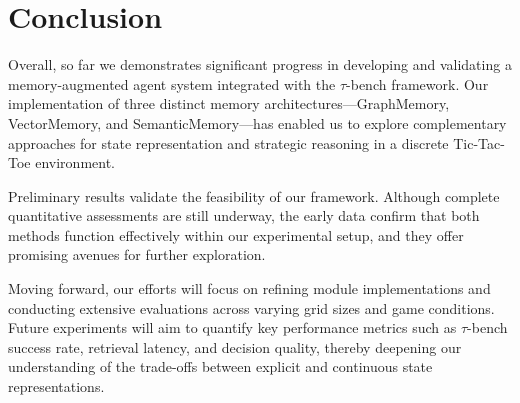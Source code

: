 \documentclass{article}
\begin{document}
\section{Conclusion}
Overall, so far we demonstrates significant progress in developing and validating a memory-augmented agent system integrated with the $\tau$-bench framework. Our implementation of three distinct memory architectures—GraphMemory, VectorMemory, and SemanticMemory—has enabled us to explore complementary approaches for state representation and strategic reasoning in a discrete Tic-Tac-Toe environment.

Preliminary results validate the feasibility of our framework. Although complete quantitative assessments are still underway, the early data confirm that both methods function effectively within our experimental setup, and they offer promising avenues for further exploration.

Moving forward, our efforts will focus on refining module implementations and conducting extensive evaluations across varying grid sizes and game conditions. Future experiments will aim to quantify key performance metrics such as $\tau$-bench success rate, retrieval latency, and decision quality, thereby deepening our understanding of the trade-offs between explicit and continuous state representations. 
\end{document}

